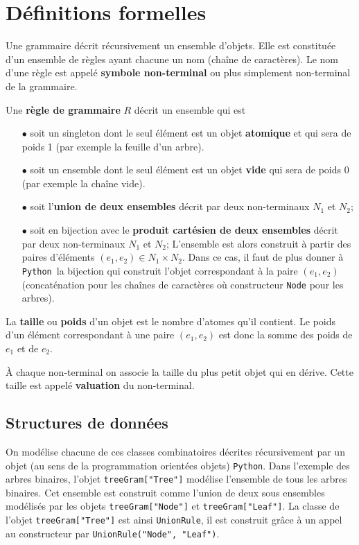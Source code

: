 \documentclass[11pt]{article}
\renewcommand{\emph}[1]{\textbf{#1}}
\newcommand{\Python}{\texttt{Python}}
\begin{document}
\section{Définitions formelles}

Une grammaire décrit récursivement un ensemble d'objets. Elle est constituée
d'un ensemble de règles ayant chacune un nom (chaîne de caractères). Le nom
d'une règle est appelé \emph{symbole non-terminal} ou plus simplement
non-terminal de la grammaire.  \medskip

Une \emph{règle de grammaire} $R$ décrit un ensemble qui est
\begin{itemize}
\item[$\bullet$] soit un singleton dont le seul élément est un objet
  \emph{atomique} et qui sera de poids 1 (par exemple la feuille d'un arbre).
\item[$\bullet$] soit un ensemble dont le seul élément est un objet
  \emph{vide} qui sera de poids 0 (par exemple la chaîne vide).
\item[$\bullet$] soit l'\emph{union de deux ensembles} décrit par deux
  non-terminaux $N_1$ et $N_2$;
\item[$\bullet$] soit en bijection avec le \emph{produit cartésien de deux
    ensembles} décrit par deux non-terminaux $N_1$ et $N_2$; L'ensemble est
  alors construit à partir des paires d'éléments $(e_1, e_2) \in N_1 \times
  N_2$. Dans ce cas, il faut de plus donner à \Python\ la bijection qui
  construit l'objet correspondant à la paire $(e_1, e_2)$ (concaténation pour
  les chaînes de caractères où constructeur \texttt{Node} pour les arbres).
\end{itemize}
\medskip

La \emph{taille} ou \emph{poids} d'un objet est le nombre d'atomes qu'il
contient. Le poids d'un élément correspondant à une paire $(e_1, e_2)$ est
donc la somme des poids de $e_1$ et de $e_2$.

À chaque non-terminal on associe la taille du plus petit objet qui en dérive.
Cette taille est appelé \emph{valuation} du non-terminal.


\subsection{Structures de données}

On modélise chacune de ces classes combinatoires décrites récursivement par un
objet (au sens de la programmation orientées objets) \Python. Dans l'exemple
des arbres binaires, l'objet \verb+treeGram["Tree"]+ modélise l'ensemble de
tous les arbres binaires. Cet ensemble est construit comme l'union de deux
sous ensembles modélisés par les objets \verb+treeGram["Node"]+ et
\verb+treeGram["Leaf"]+.  La classe de l'objet \verb+treeGram["Tree"]+ est
ainsi \verb+UnionRule+, il est construit grâce à un appel au constructeur par
\verb+UnionRule("Node", "Leaf")+.
\end{document}
